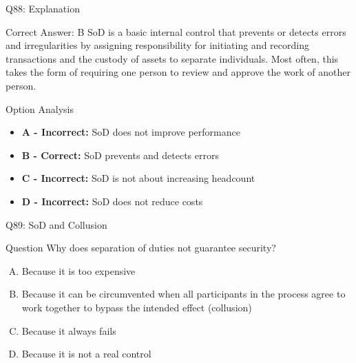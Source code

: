 \documentclass{beamer}
\begin{document}
	\begin{frame}{Q88: Explanation}
		\begin{block}{Correct Answer: B}
			SoD is a basic internal control that prevents or detects errors and irregularities by assigning responsibility for initiating and recording transactions and the custody of assets to separate individuals. Most often, this takes the form of requiring one person to review and approve the work of another person.
		\end{block}
		\begin{block}{Option Analysis}
			\begin{itemize}
				\item \textbf{A - Incorrect:} SoD does not improve performance
				\item \textbf{B - Correct:} SoD prevents and detects errors
				\item \textbf{C - Incorrect:} SoD is not about increasing headcount
				\item \textbf{D - Incorrect:} SoD does not reduce costs
			\end{itemize}
		\end{block}
	\end{frame}
	
	\begin{frame}{Q89: SoD and Collusion}
		\begin{block}{Question}
			Why does separation of duties not guarantee security?
		\end{block}
		\begin{enumerate}[(A)]
			\item Because it is too expensive
			\item Because it can be circumvented when all participants in the process agree to work together to bypass the intended effect (collusion)
			\item Because it always fails
			\item Because it is not a real control
		\end{enumerate}
	\end{frame}
	
\end{document}

